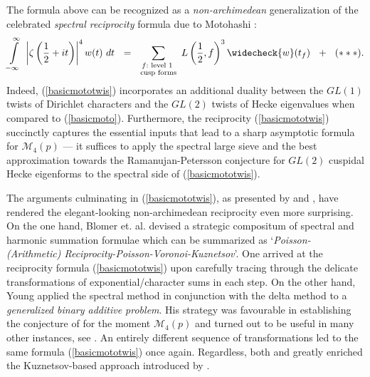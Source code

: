 \documentclass[11pt,reqno]{amsart}
\theoremstyle{definition}
\theoremstyle{definition}
\theoremstyle{remark}
\numberwithin{equation}{section}
\begin{document}
The formula above can be recognized  as a \textit{non-archimedean} generalization of the  celebrated \textit{spectral reciprocity} formula due to Motohashi  \cite{Mo93, Mo97}:
\begin{align}\label{basicmoto}
	\int\limits_{-\infty}^{\infty}  \ \left|\zeta\left(\frac{1}{2}+it\right)\right|^4 w(t)   \ dt 
	\  \ = \ \  	\sum_{\substack{f: \text{ level $1$ } \\ \text{cusp forms}}} \  L\left( \frac{1}{2}, f\right)^3 \widecheck{w}(t_{f})     \  \ + \  \  (***). 
\end{align}
 Indeed,  (\ref{basicmototwis}) incorporates  an additional  duality between  the  $GL(1)$ twists of  Dirichlet characters and the $GL(2)$   twists of  Hecke eigenvalues when compared to  (\ref{basicmoto}). Furthermore, the reciprocity  (\ref{basicmototwis}) succinctly captures   the essential  inputs that  lead to  a sharp asymptotic formula for $\mathcal{M}_{4}(p)$ ---  it suffices to apply the spectral large sieve and the best  approximation towards the Ramanujan-Petersson conjecture for $GL(2)$ cuspidal Hecke eigenforms to the spectral side of  (\ref{basicmototwis}). 

 The arguments culminating in (\ref{basicmototwis}), as presented by  \cite{Y11} and \cite{BHKM20}, have rendered the elegant-looking non-archimedean reciprocity  even more surprising.    On the one hand, Blomer et. al. \cite{BHKM20}  devised a strategic compositum of spectral and harmonic summation formulae   which can be summarized as  `\textit{Poisson-(Arithmetic) Reciprocity-Poisson-Voronoi-Kuznetsov}'.  One arrived at the reciprocity formula (\ref{basicmototwis}) upon carefully tracing through 
 the delicate   transformations of exponential/character sums  in each step.   On the other hand,  Young \cite{Y11} applied  the spectral method in conjunction with the delta method to a \textit{generalized binary additive problem}.  His strategy was favourable in establishing  the conjecture of \cite{CFKRS05} for the moment $\mathcal{M}_{4}(p)$ and turned out to be useful in many other instances, see \cite{HY10,  BBLR20, Wu22, Za19, Be19, Ng21, HN22}.  An entirely different sequence of transformations led to the same formula (\ref{basicmototwis}) once again.  Regardless,  both \cite{Y11} and \cite{BHKM20} greatly enriched the Kuznetsov-based approach introduced by  \cite{Mo93}. 
 
\end{document}
